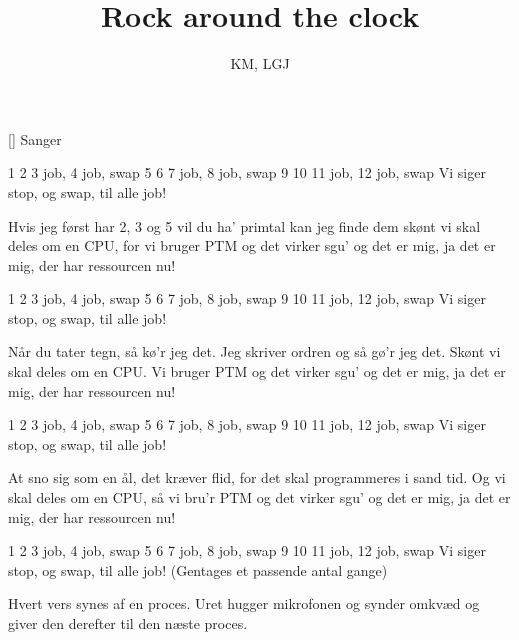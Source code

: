 \documentclass[a4paper,11pt]{article}
\title{Rock around the clock}
\author{KM, LGJ}
\begin{document}
\maketitle

\begin{roles}
  [] Sanger
\end{roles}

\begin{song}
  1 2 3 job, 4 job, swap
  5 6 7 job, 8 job, swap
  9 10 11 job, 12 job, swap
  Vi siger stop, og swap, til alle job!

Hvis jeg først har 2, 3 og 5
vil du ha' primtal kan jeg finde dem
skønt vi skal deles om en CPU,
for vi bruger PTM og det virker sgu'
og det er mig, ja det er mig, der har ressourcen nu!

  1 2 3 job, 4 job, swap
  5 6 7 job, 8 job, swap
  9 10 11 job, 12 job, swap
  Vi siger stop, og swap, til alle job!

Når du tater tegn, så kø'r jeg det.
Jeg skriver ordren og så gø'r jeg det.
Skønt vi skal deles om en CPU.
Vi bruger PTM og det virker sgu'
og det er mig, ja det er mig, der har ressourcen nu!

  1 2 3 job, 4 job, swap
  5 6 7 job, 8 job, swap
  9 10 11 job, 12 job, swap
  Vi siger stop, og swap, til alle job!

At sno sig som en ål, det kræver flid,
for det skal programmeres i sand tid.
Og vi skal deles om en CPU,
så vi bru'r PTM og det virker sgu'
og det er mig, ja det er mig, der har ressourcen nu!

  1 2 3 job, 4 job, swap
  5 6 7 job, 8 job, swap
  9 10 11 job, 12 job, swap
  Vi siger stop, og swap, til alle job!
(Gentages et passende antal gange)

Hvert vers synes af en proces.  Uret hugger mikrofonen og synder
omkvæd og giver den derefter til den næste proces.
\end{song}
\end{document}
